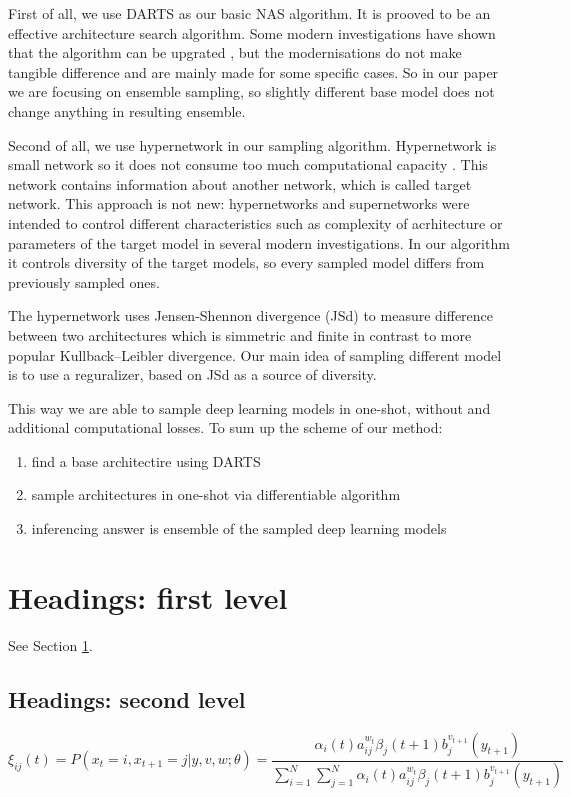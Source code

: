 \documentclass{article}
\begin{document}
First of all, we use DARTS \citep{darts} as our basic NAS algorithm. It is prooved to be an effective architecture search algorithm. Some
modern investigations have shown that the algorithm can be upgrated \citep{p-darts, sdarts, darts-}, but the modernisations do not make tangible difference
and are mainly made for some specific cases. So in our paper we are focusing on ensemble sampling, so slightly different base
model does not change anything in resulting ensemble.

Second of all, we use hypernetwork in our sampling algorithm. Hypernetwork is small network so it does not
consume too much computational capacity \citep{hypernetworks}. This network contains information about another network, which is called target network.
This approach is not new: hypernetworks and supernetworks were intended to control different characteristics such as
complexity of acrhitecture \citep{darts-cc} or parameters of the target model \citep{cont-learn} in several modern investigations. In our algorithm it controls 
diversity of the target models, so every sampled model differs from previously sampled ones.

The hypernetwork uses Jensen-Shennon divergence (JSd) to measure difference between two architectures which is simmetric and finite
in contrast to more popular Kullback–Leibler divergence. Our main idea of sampling different model is to use a reguralizer,
based on JSd as a source of diversity.

This way we are able to sample deep learning models in one-shot, without and additional computational losses.
To sum up the scheme of our method:
\begin{enumerate} 
    \item find a base architectire using DARTS
    \item sample architectures in one-shot via differentiable algorithm
    \item inferencing answer is ensemble of the sampled deep learning models
\end{enumerate}


\section{Headings: first level}
\label{sec:headings}

\lipsum[4] See Section \ref{sec:headings}.

\subsection{Headings: second level}
\lipsum[5]
\begin{equation}
	\xi _{ij}(t)=P(x_{t}=i,x_{t+1}=j|y,v,w;\theta)= {\frac {\alpha _{i}(t)a^{w_t}_{ij}\beta _{j}(t+1)b^{v_{t+1}}_{j}(y_{t+1})}{\sum _{i=1}^{N} \sum _{j=1}^{N} \alpha _{i}(t)a^{w_t}_{ij}\beta _{j}(t+1)b^{v_{t+1}}_{j}(y_{t+1})}}
\end{equation}
\end{document}

